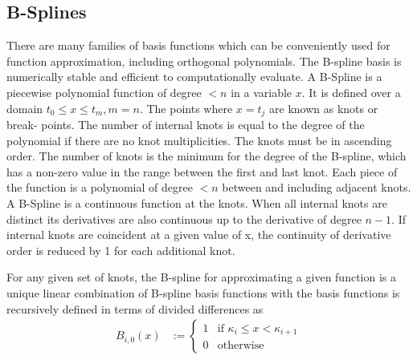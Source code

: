 \subsection{B-Splines}

There are many families of basis functions which can be conveniently used for function approximation,
including orthogonal polynomials. The B-spline basis \citep{DeBoor1972} is numerically stable and efficient to
computationally evaluate. A B-Spline is a piecewise polynomial function of degree $< n$ in a variable $x$. It
is defined over a domain $t_0 \leq x \leq t_m, m=n$. The points where $x = t_j$ are known as knots or break-
points. The number of internal knots is equal to the degree of the polynomial if there are no knot
multiplicities. The knots must be in ascending order. The number of knots is the minimum for the degree of the
B-spline, which has a non-zero value in the range between the first and last knot. Each piece of the function
is a polynomial of degree $< n$ between and including adjacent knots. A B-Spline is a continuous function at
the knots. When all internal knots are distinct its derivatives are also continuous up to the derivative of
degree $n - 1$. If internal knots are coincident at a given value of x, the continuity of derivative order is
reduced by 1 for each additional knot.

For any given set of knots, the B-spline for approximating a given function is a unique linear combination of
B-spline basis functions with the basis functions is recursively defined in terms of divided differences as
$$
\begin{array}{rl}
	B_{i, 0}(x) & := \begin{cases}                                                                                                        
	1           & \text{if } \kappa_i \leq x < \kappa_{i+1}                                                                                         \\
	0           & \text{otherwise}                                                                                                        
	\end{cases}
\end{array}
$$

